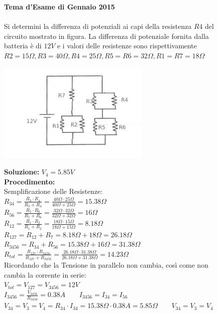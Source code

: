 \begin{figure}[h!]
\textbf{Tema d'Esame di Gennaio 2015}\\ \\
Si determini la differenza di potenziali ai capi della resistenza $R4$ del circuito mostrato in figura. La differenza di potenziale fornita dalla batteria è di $12V$ e i valori delle resistenze sono rispettivamente $R2=15\Omega, R3=40\Omega, R4=25\Omega, R5=R6=32\Omega, R1=R7=18\Omega$
\begin{center}
		\includegraphics[scale=1.2]{ES5/GEN052015.jpg}
	\end{center}
	\begin{boxed}
		\null\hfill \textbf{Soluzione:} $V_4 = 5.85 V$\\
		\textbf{Procedimento: } \\
		Semplificazione delle Resistenze:\\
		$R_{34}=\frac{R_3\cdot R_4}{R_3+R_4}=\frac{40\Omega \cdot 25\Omega}{40\Omega+25\Omega}=15.38\Omega$\\
		$R_{56}=\frac{R_5\cdot R_6}{R_5+R_6}=\frac{32\Omega \cdot 32\Omega}{32\Omega+32\Omega}=16\Omega$\\
		$R_{12}=\frac{R_1\cdot R_2}{R_1+R_2}=\frac{18\Omega \cdot 15\Omega}{18\Omega+15\Omega}=8.18\Omega$\\
		$R_{127}=R_{12}+R_7=8.18\Omega + 18\Omega=26.18\Omega$\\
		$R_{3456}=R_{34}+R_{56}=15.38\Omega+16\Omega=31.38\Omega$\\
		$R_{tot}=\frac{R_{127}\cdot R_{3456}}{R_{127}+R_{3456}}=\frac{26.18\Omega \cdot 31.38\Omega}{26.18\Omega + 31.38\Omega}=14.23\Omega$\\
		Ricordando che la Tensione in parallelo non cambia, così come non cambia la corrente in serie:\\
		$V_{tot}=V_{127}=V_{3456}=12V$\\
		$I_{3456}=\frac{V_{3456}}{R_{3456}}=0.38A \qquad I_{3456}=I_{34}=I_{56}$\\
		$V_{34}=V_3=V_4=R_{34}\cdot I_{34}=15.38\Omega \cdot 0.38A=5.85\Omega \qquad V_{34}=V_3=V_4$
	\end{boxed}
\end{figure}

